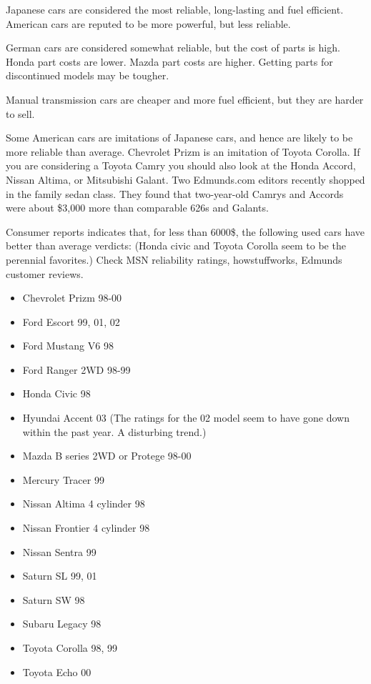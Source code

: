 \documentclass[oneside, article]{memoir}
\begin{document}
Japanese cars are considered the most reliable, long-lasting and fuel efficient. American cars are reputed to be more powerful, but less reliable.

German cars are considered somewhat reliable, but the cost of parts is high. Honda part costs are lower. Mazda part costs are higher. Getting parts for discontinued models may be tougher.

Manual transmission cars are cheaper and more fuel efficient, but they are harder to sell.

Some American cars are imitations of Japanese cars, and hence are likely to be more reliable than average. Chevrolet Prizm is an imitation of Toyota Corolla.  If you are considering a Toyota Camry you should also look at the Honda Accord, Nissan Altima, or Mitsubishi Galant. Two Edmunds.com editors recently shopped in the family sedan class. They found that two-year-old Camrys and Accords were about \$3,000 more than comparable 626s and Galants.

Consumer reports indicates that, for less than 6000\$, the following used cars have better than average verdicts: (Honda civic and Toyota Corolla seem to be the perennial favorites.) Check MSN reliability ratings, howstuffworks, Edmunds customer reviews.

\begin{itemize}
\item Chevrolet Prizm 98-00
\item Ford Escort 99, 01, 02
\item Ford Mustang V6 98
\item Ford Ranger 2WD 98-99
\item Honda Civic 98
\item Hyundai Accent 03 (The ratings for the 02 model seem to have gone down within the past year. A disturbing trend.)
\item Mazda B series 2WD or Protege 98-00
\item Mercury Tracer 99
\item Nissan Altima 4 cylinder 98
\item Nissan Frontier 4 cylinder 98
\item Nissan Sentra 99
\item Saturn SL 99, 01
\item Saturn SW 98
\item Subaru Legacy 98
\item Toyota Corolla 98, 99
\item Toyota Echo 00
\end{itemize}
\end{document}
